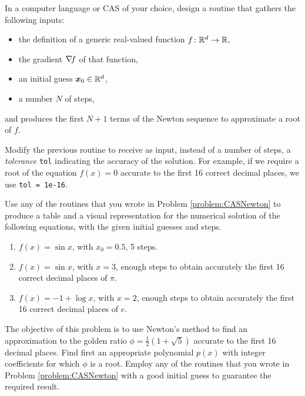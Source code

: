 \begin{problem}[CAS]\label{problem:CASNewton}
In a computer language or CAS of your choice, design a routine that gathers the following inputs:
\begin{itemize}
\item the definition of a generic real-valued function $f\colon \mathbb{R}^d \to \mathbb{R}$, 
\item the gradient $\mathop{\nabla\! {f}}$ of that function,
\item an initial guess $\boldsymbol{x}_0 \in \mathbb{R}^d$, 
\item a number $N$ of steps,
\end{itemize}
and produces the first $N+1$ terms of the Newton sequence to approximate a root of $f$.

Modify the previous routine to receive as input, instead of a number of steps, a \emph{tolerance} \texttt{tol} indicating the accuracy of the solution.  For example, if we require a root of the equation $f(x)=0$ accurate to the first 16 correct decimal places, we use \texttt{tol = 1e-16}.
\end{problem}

\begin{problem}[CAS]
Use any of the routines that you wrote in Problem \ref{problem:CASNewton} to produce a table and a visual representation for the numerical solution of the following equations, with the given initial guesses and steps.
\begin{enumerate}
\item $f(x) = \sin x$, with $x_0=0.5$, 5 steps.
\item $f(x) = \sin x$, with $x=3$, enough steps to obtain accurately the first 16 correct decimal places of $\pi$.
\item $f(x) = -1+\log x$, with $x=2$, enough steps to obtain accurately the first 16 correct decimal places of $e$.
\end{enumerate}
\end{problem}

\begin{problem}[CAS]
The objective of this problem is to use Newton's method to find an approximation to the golden ratio $\phi=\frac{1}{2}(1+\sqrt{5})$ accurate to the first 16 decimal places.  Find first an appropriate polynomial $p(x)$ with integer coefficients for which $\phi$ is a root.  Employ any of the routines that you wrote in Problem \ref{problem:CASNewton} with a good initial guess to guarantee the required result.
\end{problem}

